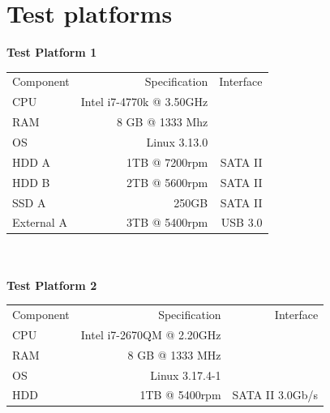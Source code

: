 \documentclass[12pt]{article}
\begin{document}
\section {Test platforms}
\textbf{Test Platform 1}\\
\vspace{5mm}
\begin{tabular}{|l|r|r|}
  \hline
  Component & Specification                   & Interface \\
  CPU       & Intel i7-4770k @ 3.50GHz        &           \\
  RAM       & 8 GB @ 1333 Mhz                 &           \\
  OS        & Linux 3.13.0                    &           \\
  HDD A     &         1TB @ 7200rpm           & SATA II   \\
  HDD B     &                 2TB @ 5600rpm   & SATA II   \\
  SSD A     &         250GB                   & SATA II   \\
  External A& 3TB @ 5400rpm                   & USB 3.0   \\
  \hline
\end{tabular}\\\\
\textbf{Test Platform 2}\\
\vspace{5mm}
\begin{tabular}{|l|r|r|}
  \hline
  Component & Specification                   & Interface \\
  CPU       & Intel i7-2670QM @ 2.20GHz       &           \\
  RAM       & 8 GB @ 1333 MHz                 &           \\
  OS        & Linux 3.17.4-1                  &           \\
  HDD       & 1TB @ 5400rpm                   & SATA II 3.0Gb/s  \\
  \hline
\end{tabular}
\end{document}
